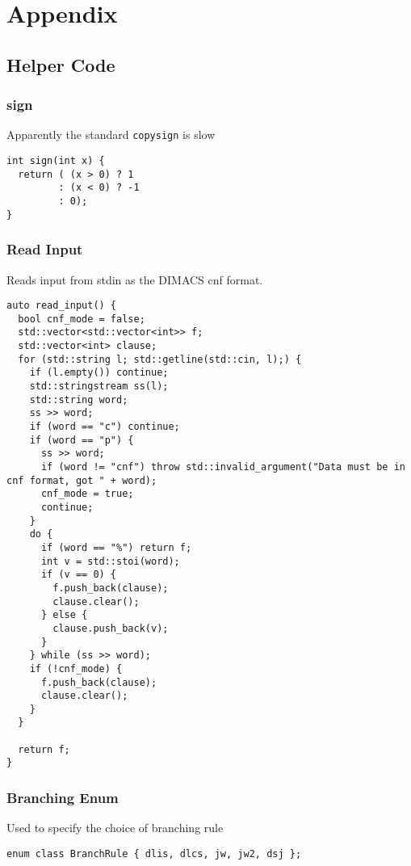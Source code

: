 \documentclass[10pt,AMS Euler]{article}
\begin{document}
\section*{Appendix}
\label{sec:org723a2be}
\subsection*{Helper Code}
\label{sec:org6edef4e}
\subsubsection*{sign}
\label{sec:org4f7eba2}
Apparently the standard \texttt{copysign} is slow
\begin{verbatim}
int sign(int x) {
  return ( (x > 0) ? 1
         : (x < 0) ? -1
         : 0);
}
\end{verbatim}
\subsubsection*{Read Input}
\label{sec:orgc93bc3e}
Reads input from stdin as the DIMACS cnf format.
\begin{verbatim}
auto read_input() {
  bool cnf_mode = false;
  std::vector<std::vector<int>> f;
  std::vector<int> clause;
  for (std::string l; std::getline(std::cin, l);) {
    if (l.empty()) continue;
    std::stringstream ss(l);
    std::string word;
    ss >> word;
    if (word == "c") continue;
    if (word == "p") {
      ss >> word;
      if (word != "cnf") throw std::invalid_argument("Data must be in cnf format, got " + word);
      cnf_mode = true;
      continue;
    }
    do {
      if (word == "%") return f;
      int v = std::stoi(word);
      if (v == 0) {
        f.push_back(clause);
        clause.clear();
      } else {
        clause.push_back(v);
      }
    } while (ss >> word);
    if (!cnf_mode) { 
      f.push_back(clause);
      clause.clear();
    }
  }
  
  return f;
}
\end{verbatim}
\subsubsection*{Branching Enum}
\label{sec:org8d26f45}
Used to specify the choice of branching rule
\begin{verbatim}
enum class BranchRule { dlis, dlcs, jw, jw2, dsj };
\end{verbatim}
\end{document}
